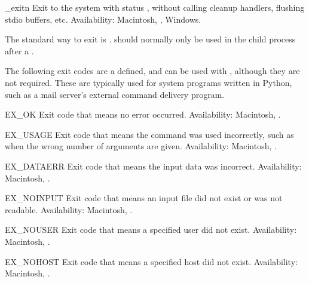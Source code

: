 \begin{funcdesc}{_exit}{n}
Exit to the system with status , without calling cleanup
handlers, flushing stdio buffers, etc.
Availability: Macintosh, \UNIX, Windows.

\begin{notice}
The standard way to exit is .
 should normally only be used in the child process
after a .
\end{notice}
\end{funcdesc}

The following exit codes are a defined, and can be used with
, although they are not required.  These are
typically used for system programs written in Python, such as a
mail server's external command delivery program.

\begin{datadesc}{EX_OK}
Exit code that means no error occurred.
Availability: Macintosh, \UNIX.
\end{datadesc}

\begin{datadesc}{EX_USAGE}
Exit code that means the command was used incorrectly, such as when
the wrong number of arguments are given.
Availability: Macintosh, \UNIX.
\end{datadesc}

\begin{datadesc}{EX_DATAERR}
Exit code that means the input data was incorrect.
Availability: Macintosh, \UNIX.
\end{datadesc}

\begin{datadesc}{EX_NOINPUT}
Exit code that means an input file did not exist or was not readable.
Availability: Macintosh, \UNIX.
\end{datadesc}

\begin{datadesc}{EX_NOUSER}
Exit code that means a specified user did not exist.
Availability: Macintosh, \UNIX.
\end{datadesc}

\begin{datadesc}{EX_NOHOST}
Exit code that means a specified host did not exist.
Availability: Macintosh, \UNIX.
\end{datadesc}

